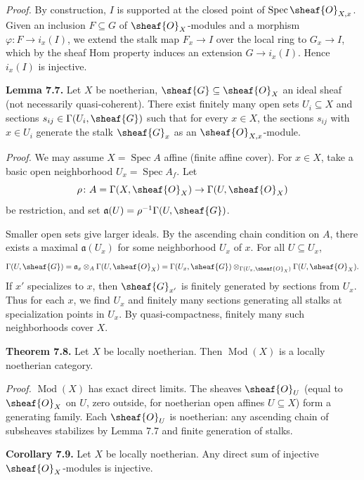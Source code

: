\setcounter{page}{124}
\textit{Proof.}
By construction, $I$ is supported at the closed point of $\operatorname{Spec}\sheaf{O}_{X,x}$.
Given an inclusion $F\subseteq G$ of $\sheaf{O}_X$-modules and a morphism $\varphi\colon F\to i_x(I)$, we extend the stalk map $F_x\to I$ over the local ring to $G_x\to I$, which by the sheaf Hom property induces an extension $G\to i_x(I)$. Hence $i_x(I)$ is injective.

\textbf{Lemma 7.7.}
Let $X$ be noetherian, $\sheaf{G}\subseteq\sheaf{O}_X$ an ideal sheaf (not necessarily quasi-coherent). There exist finitely many open sets $U_i\subseteq X$ and sections $s_{ij}\in\Gamma(U_i,\sheaf{G})$ such that for every $x\in X$, the sections $s_{ij}$ with $x\in U_i$ generate the stalk $\sheaf{G}_x$ as an $\sheaf{O}_{X,x}$-module.

\textit{Proof.}
We may assume $X=\operatorname{Spec}A$ affine (finite affine cover). For $x\in X$, take a basic open neighborhood $U_x=\operatorname{Spec}A_f$. Let
\[
\rho\colon A=\Gamma(X,\sheaf{O}_X)\to\Gamma(U,\sheaf{O}_X)
\]
be restriction, and set $\mathfrak{a}(U)=\rho^{-1}\Gamma(U,\sheaf{G})$.

\setcounter{page}{125}
Smaller open sets give larger ideals. By the ascending chain condition on $A$, there exists a maximal $\mathfrak{a}(U_x)$ for some neighborhood $U_x$ of $x$. For all $U\subseteq U_x$,
\[
\Gamma(U,\sheaf{G})
= \mathfrak{a}_x\otimes_A \Gamma(U,\sheaf{O}_X)
= \Gamma(U_x,\sheaf{G})\otimes_{\Gamma(U_x,\sheaf{O}_X)}\Gamma(U,\sheaf{O}_X).
\]
If $x'$ specializes to $x$, then $\sheaf{G}_{x'}$ is finitely generated by sections from $U_x$. Thus for each $x$, we find $U_x$ and finitely many sections generating all stalks at specialization points in $U_x$. By quasi-compactness, finitely many such neighborhoods cover $X$.

\setcounter{page}{126}
\textbf{Theorem 7.8.}
Let $X$ be locally noetherian. Then $\operatorname{Mod}(X)$ is a locally noetherian category.

\textit{Proof.}
$\operatorname{Mod}(X)$ has exact direct limits. The sheaves $\sheaf{O}_U$ (equal to $\sheaf{O}_X$ on $U$, zero outside, for noetherian open affines $U\subseteq X$) form a generating family. Each $\sheaf{O}_U$ is noetherian: any ascending chain of subsheaves stabilizes by Lemma 7.7 and finite generation of stalks.

\setcounter{page}{127}
\textbf{Corollary 7.9.}
Let $X$ be locally noetherian. Any direct sum of injective $\sheaf{O}_X$-modules is injective.

